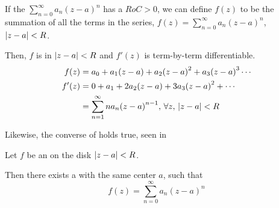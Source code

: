 \begin{theorem}\label{thm:Power_Series-Analytic_Function}
  If the  $\sum_{n=0}^{\infty} a_{n} {(z-a)}^{n}$ has a  $RoC > 0$, we can define $f(z)$ to be the summation of all the terms in the series, $f(z) = \sum_{n = 0}^{\infty} a_{n} {(z-a)}^{n}$, $\left\lvert z-a \right\rvert < R$.

  Then, $f$ is  in $\left\lvert z-a \right\rvert < R$ and $f'(z)$ is term-by-term differentiable.
  \begin{align*}
    f(z) &= a_{0} + a_{1} (z-a) + a_{2} {(z-a)}^{2} + a_{3} {(z-a)}^{3} \cdots \\
    f'(z) &= 0 + a_{1} + 2 a_{2} (z-a) + 3 a_{3} {(z-a)}^{2} + \cdots \\
         &= \sum_{n=1}^{\infty} n a_{n} {(z-a)}^{n-1}, \, \forall z, \, \left\lvert z-a \right\rvert < R
  \end{align*}
\end{theorem}

Likewise, the converse of  holds true, seen in 

\begin{theorem}\label{thm:Analytic_Function-Power_Series}
  Let $f$ be an   on the disk $\left\lvert z-a \right\rvert < R$.

  Then there exists a  with the same center $a$, such that
  \begin{equation*}
    f(z) = \sum_{n = 0}^{\infty} a_{n} {(z-a)}^{n}
  \end{equation*}
\end{theorem}






